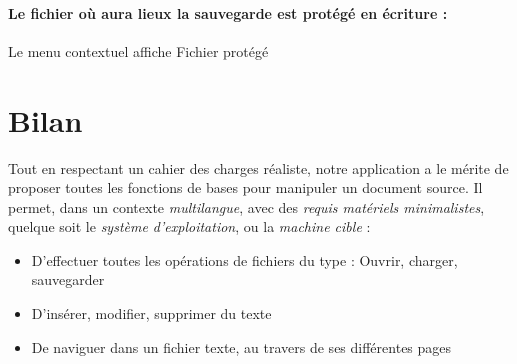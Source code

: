 \paragraph{Le fichier où aura lieux la sauvegarde est protégé en écriture :} Le menu contextuel affiche \og Fichier protégé\fg

\section{Bilan}
Tout en respectant un cahier des charges réaliste, notre application a le mérite de proposer toutes les fonctions de bases pour manipuler un document source. Il permet, dans un contexte \emph{multilangue}, avec des \emph{requis matériels minimalistes}, quelque soit le \emph{système d'exploitation}, ou la \emph{machine cible} :
\begin{itemize}
	\item D'effectuer toutes les opérations de fichiers du type : Ouvrir, charger, sauvegarder
	\item D'insérer, modifier, supprimer du texte
	\item De naviguer dans un fichier texte, au travers de ses différentes pages
\end{itemize}
